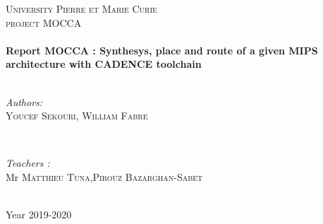 \documentclass[11pt,a4paper,sans]{report}
\begin{document}
\begin{titlepage}

	\center %


	\textsc{\LARGE University Pierre et Marie Curie}\\[1.5cm] %
	\textsc{\Large project MOCCA}\\[0.5cm] %

	\vfill
	\HRule \\[0.4cm]
	{ \huge \bfseries Report MOCCA : Synthesys, place and route of a given MIPS architecture with CADENCE toolchain}\\[0.4cm] 
	\HRule \\[1.5cm]
	\vfill

	\begin{minipage}{0.4\textwidth}
		\begin{flushleft} \large
			\emph{Authors:}\\
			\textsc{Youcef Sekouri, William Fabre} 
		\end{flushleft}
	\end{minipage}
	~
	\begin{minipage}{0.4\textwidth}
		\begin{flushright} \large
			\emph{Teachers :} \\
			Mr \textsc{Matthieu Tuna},\textsc{Pirouz Bazarghan-Sabet}
		\end{flushright}
	\end{minipage}\\[2cm]


	{\large Year 2019-2020}\\[2cm] %

\end{titlepage}
\end{document}
